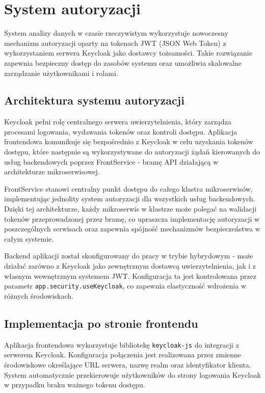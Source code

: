 \section{System autoryzacji}
\label{chap:autoryzacja}

System analizy danych w czasie rzeczywistym wykorzystuje nowoczesny mechanizm autoryzacji oparty na tokenach JWT (JSON Web Token) z wykorzystaniem serwera Keycloak jako dostawcy tożsamości. Takie rozwiązanie zapewnia bezpieczny dostęp do zasobów systemu oraz umożliwia skalowalne zarządzanie użytkownikami i rolami.

\subsection{Architektura systemu autoryzacji}

Keycloak pełni rolę centralnego serwera uwierzytelnienia, który zarządza procesami logowania, wydawania tokenów oraz kontroli dostępu. Aplikacja frontendowa komunikuje się bezpośrednio z Keycloak w celu uzyskania tokenów dostępu, które następnie są wykorzystywane do autoryzacji żądań kierowanych do usług backendowych poprzez FrontService - bramę API działającą w architekturze mikroserwisowej.

FrontService stanowi centralny punkt dostępu do całego klastra mikroserwisów, implementując jednolity system autoryzacji dla wszystkich usług backendowych. Dzięki tej architekturze, każdy mikroserwis w klastrze może polegać na walidacji tokenów przeprowadzonej przez bramę, co upraszcza implementację autoryzacji w poszczególnych serwisach oraz zapewnia spójność mechanizmów bezpieczeństwa w całym systemie.

Backend aplikacji został skonfigurowany do pracy w trybie hybrydowym - może działać zarówno z Keycloak jako zewnętrznym dostawcą uwierzytelnienia, jak i z własnym wewnętrznym systemem JWT. Konfiguracja ta jest kontrolowana przez parametr \texttt{app.security.useKeycloak}, co zapewnia elastyczność wdrożenia w różnych środowiskach.

\subsection{Implementacja po stronie frontendu}

Aplikacja frontendowa wykorzystuje bibliotekę \texttt{keycloak-js} do integracji z serwerem Keycloak. Konfiguracja połączenia jest realizowana przez zmienne środowiskowe określające URL serwera, nazwę realm oraz identyfikator klienta. System automatycznie przekierowuje użytkowników do strony logowania Keycloak w przypadku braku ważnego tokenu dostępu.

